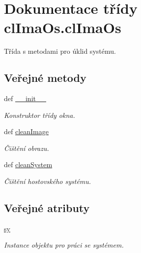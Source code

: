 \hypertarget{classclImaOs_1_1clImaOs}{\section{Dokumentace třídy cl\-Ima\-Os.\-cl\-Ima\-Os}
\label{d5/d13/classclImaOs_1_1clImaOs}
}


Třída s metodami pro úklid systému.  


\subsection*{Veřejné metody}
\begin{DoxyCompactItemize}
\item 
def \hyperlink{classclImaOs_1_1clImaOs_a645fab5aef6d331821b561e69d665fb0}{\-\_\-\-\_\-init\-\_\-\-\_\-}
\begin{DoxyCompactList}\small\item\em Konstruktor třídy okna. \end{DoxyCompactList}\item 
def \hyperlink{classclImaOs_1_1clImaOs_a98998f9ce2a3918b093ebed313e95061}{clean\-Image}
\begin{DoxyCompactList}\small\item\em Čištění obrazu. \end{DoxyCompactList}\item 
def \hyperlink{classclImaOs_1_1clImaOs_adbf1356c7c45a2aeaf9680c50856c18a}{clean\-System}
\begin{DoxyCompactList}\small\item\em Čištění hostovského systému. \end{DoxyCompactList}\end{DoxyCompactItemize}
\subsection*{Veřejné atributy}
\begin{DoxyCompactItemize}
\item 
\hypertarget{classclImaOs_1_1clImaOs_a269176bf9e06df5c8ed6a4d322cb2268}{\hyperlink{classclImaOs_1_1clImaOs_a269176bf9e06df5c8ed6a4d322cb2268}{sy}}\label{d5/d13/classclImaOs_1_1clImaOs_a269176bf9e06df5c8ed6a4d322cb2268}

\begin{DoxyCompactList}\small\item\em Instance objektu pro práci se systémem. \end{DoxyCompactList}\end{DoxyCompactItemize}


